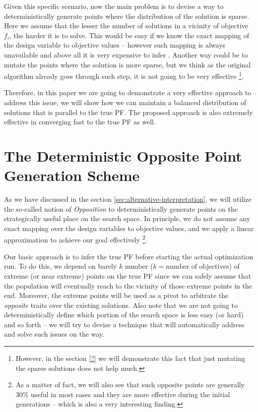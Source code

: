 \documentclass[journal]{IEEEtran}
\begin{document}
Given this specific scenario, now the main problem is to devise a way to deterministically generate points where the distribution of the solution is sparse. Here we assume that the lesser the number of solutions in a vicinity of objective \(f_i\), the harder it is to solve. This would be easy if we know the exact mapping of the design variable to objective values -- however such mapping is always unavailable and above all it is very expensive to infer \cite{?}. Another way could be to mutate the points where the solution is more sparse, but we think as the original algorithm already goes through such step, it is not going to be very effective \footnote{However, in the section \ref{?} we will demonstrate this fact that just mutating the sparse solutions does not help much.}.

Therefore, in this paper we are going to demonstrate a very effective approach to address this issue, we will show how we can maintain a balanced distribution of solutions that is parallel to the true PF. The proposed approach is also extremely effective in converging fast to the true PF as well.   

\section{The Deterministic Opposite Point Generation Scheme}
\label{sec:generation-scheme}
As we have discussed in the section \ref{sec:alternative-interpretation}, we will utilize the so-called notion of \textit{Opposition} to deterministically generate points on the strategically useful place on the search space. In principle, we do not assume any exact mapping over the design variables to objective values, and we apply a linear approximation to achieve our goal effectively \footnote{As a matter of fact, we will also see that such opposite points are generally 30\% useful in most cases and they are more effective during the initial generations -- which is also a very interesting finding.}. 

Our basic approach is to infer the true PF before starting the actual optimization run. To do this, we depend on barely \(k\) number (\(k = \text{number of objectives}\)) of extreme (or near extreme) points on the true PF since we can safely assume that the population will eventually reach to the vicinity of those extreme points in the end. Moreover, the extreme points will be used as a pivot to arbitrate the \textit{opposite} traits over the existing solutions. Also note that we are not going to deterministically define which portion of the search space is less easy (or hard) and so forth -- we will try to devise a technique that will automatically address and solve such issues on the way.
\end{document}
